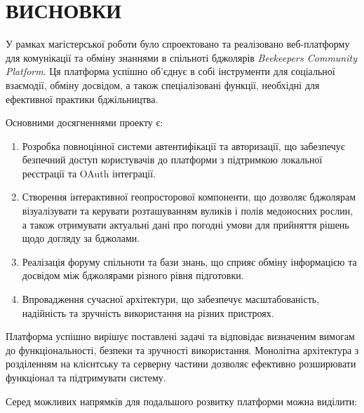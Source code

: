 
\chapter*{ВИСНОВКИ}
\label{ch:conclusions}

У рамках магістерської роботи було спроектовано та реалізовано веб-платформу для комунікації та обміну знаннями в спільноті бджолярів \textit{Beekeepers Community Platform}. Ця платформа успішно об'єднує в собі інструменти для соціальної взаємодії, обміну досвідом, а також спеціалізовані функції, необхідні для ефективної практики бджільництва.

Основними досягненнями проекту є:

\begin{enumerate}
    \item Розробка повноцінної системи автентифікації та авторизації, що забезпечує безпечний доступ користувачів до платформи з підтримкою локальної реєстрації та OAuth інтеграції.
    
    \item Створення інтерактивної геопросторової компоненти, що дозволяє бджолярам візуалізувати та керувати розташуванням вуликів і полів медоносних рослин, а також отримувати актуальні дані про погодні умови для прийняття рішень щодо догляду за бджолами.
    
    \item Реалізація форуму спільноти та бази знань, що сприяє обміну інформацією та досвідом між бджолярами різного рівня підготовки.
    
    \item Впровадження сучасної архітектури, що забезпечує масштабованість, надійність та зручність використання на різних пристроях.
\end{enumerate}

Платформа успішно вирішує поставлені задачі та відповідає визначеним вимогам до функціональності, безпеки та зручності використання. Монолітна архітектура з розділенням на клієнтську та серверну частини дозволяє ефективно розширювати функціонал та підтримувати систему.

Серед можливих напрямків для подальшого розвитку платформи можна виділити:

